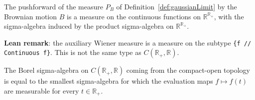 \begin{definition}\label{def:wienerMeasureAux}
  \leanok
The pushforward of the measure $P_B$ of Definition~\ref{def:gaussianLimit} by the Brownian motion $B$ is a measure on the continuous functions on $\mathbb{R}^{\mathbb{R}_+}$, with the sigma-algebra induced by the product sigma-algebra on $\mathbb{R}^{\mathbb{R}_+}$.
\end{definition}

\textbf{Lean remark}: the auxiliary Wiener measure is a measure on the subtype \texttt{\{f  // Continuous f\}}. This is not the same type as $C(\mathbb{R}_+, \mathbb{R})$.


\begin{theorem}\label{thm:ContinuousMap.borel_eq_iSup_comap_eval}
  \mathlibok
The Borel sigma-algebra on $C(\mathbb{R}_+, \mathbb{R})$ coming from the compact-open topology is equal to the smallest sigma-algebra for which the evaluation maps $f \mapsto f(t)$ are measurable for every $t \in \mathbb{R}_+$.
\end{theorem}

